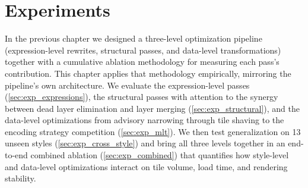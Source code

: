 \chapter{Experiments}\label{ch:experiments}

In the previous chapter we designed a three-level optimization pipeline (expression-level rewrites, structural passes, and data-level transformations) together with a cumulative ablation methodology for measuring each pass's contribution.
This chapter applies that methodology empirically, mirroring the pipeline's own architecture.
We evaluate the expression-level passes (\cref{sec:exp_expressions}), the structural passes with attention to the synergy between dead layer elimination and layer merging (\cref{sec:exp_structural}), and the data-level optimizations from advisory narrowing through tile shaving to the encoding strategy competition (\cref{sec:exp_mlt}).
We then test generalization on 13 unseen styles (\cref{sec:exp_cross_style}) and bring all three levels together in an end-to-end combined ablation (\cref{sec:exp_combined}) that quantifies how style-level and data-level optimizations interact on tile volume, load time, and rendering stability.

